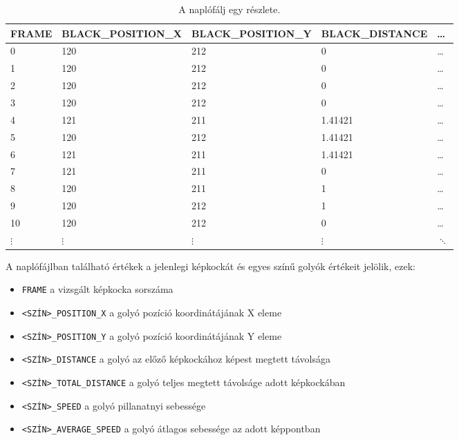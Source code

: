 \begin{table}[!ht]
    \caption{A naplófálj egy részlete.}
    \label{tab:log_file}
	\footnotesize
	\centering
	\begin{tabular}{ l l l l l }
		\toprule
		FRAME & BLACK\_POSITION\_X & BLACK\_POSITION\_Y & BLACK\_DISTANCE & \dots \\
		\midrule
        0 & 120 & 212 & 0 & \dots \\
        1 & 120 & 212 & 0 & \dots \\
        2 & 120 & 212 & 0 & \dots \\
        3 & 120 & 212 & 0 & \dots \\
        4 & 121 & 211 & 1.41421 & \dots \\
        5 & 120 & 212 & 1.41421 & \dots \\
        6 & 121 & 211 & 1.41421 & \dots \\
        7 & 121 & 211 & 0 & \dots \\
        8 & 120 & 211 & 1 & \dots \\
        9 & 120 & 212 & 1 & \dots \\
        10 & 120 & 212 & 0 & \dots \\
        $\vdots$ & $\vdots$ & $\vdots$ & $\vdots$ & $\ddots$ \\
		\bottomrule
	\end{tabular}
\end{table}

A naplófájlban található értékek a jelenlegi képkockát és egyes színű golyók értékeit jelölik, ezek:

\begin{itemize}
    \setlength\itemsep{-2pt}
    \item \lstinline{FRAME} a vizsgált képkocka sorszáma
    \item \lstinline{<SZÍN>_POSITION_X} a golyó pozíció koordinátájának X eleme
    \item \lstinline{<SZÍN>_POSITION_Y} a golyó pozíció koordinátájának Y eleme
    \item \lstinline{<SZÍN>_DISTANCE} a golyó az előző képkockához képest megtett távolsága
    \item \lstinline{<SZÍN>_TOTAL_DISTANCE} a golyó teljes megtett távolságe adott képkockában
    \item \lstinline{<SZÍN>_SPEED} a golyó pillanatnyi sebessége
    \item \lstinline{<SZÍN>_AVERAGE_SPEED} a golyó átlagos sebessége az adott képpontban
\end{itemize}

